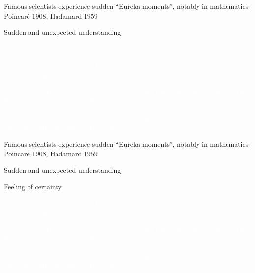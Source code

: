\documentclass[11pt]{beamer}
\begin{document}
        \begin{frame}
          Famous scientists experience sudden \textcolor{bittersweet}{``Eureka moments''}, notably in mathematics \footnotesize{Poincar\'{e} 1908, Hadamard 1959}


          \normalsize
          
          \textcolor{bittersweet}{Sudden and unexpected understanding}

          \textcolor{white}{Feeling of certainty}


        \textcolor{white}{Similar experiences are studied in the scope of problem solving where solutions come by ``insight''}

        \textcolor{white}{No awareness that it was about to come  \footnotesize{Metcalfe 1986, Metcalfe and Wiebe 1987, Bowden and Jung-Beeman 2003} }

        \normalsize

          \textcolor{white}{Immediately perceived as correct and relevant \footnotesize{Kounios and Beeman 2014, Danek and Wiley 2017, Laukkonen et al. 2020}}
 

        \end{frame}

               


        \begin{frame}

          Famous scientists experience sudden \textcolor{bittersweet}{``Eureka moments''}, notably in mathematics \footnotesize{Poincar\'{e} 1908, Hadamard 1959}



          \normalsize
          
          \textcolor{bittersweet}{Sudden and unexpected understanding}

          \textcolor{bittersweet}{Feeling of certainty}


          \textcolor{white}{Similar experiences are studied in the scope of problem solving where solutions come by ``insight''}

          \textcolor{white}{No awareness that it was about to come  \footnotesize{Metcalfe 1986, Metcalfe and Wiebe 1987, Bowden and Jung-Beeman 2003}}

          \normalsize

          \textcolor{white}{Immediately perceived as correct and relevant \footnotesize{Kounios and Beeman 2014, Danek and Wiley 2017, Laukkonen et al. 2020}}
 





        \end{frame}
\end{document}
